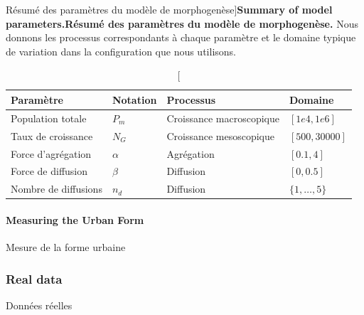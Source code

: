 \begin{table}[!ht]
\caption[Summary of model parameters][Résumé des paramètres du modèle de morphogenèse]{\textbf{Summary of model parameters.}\label{tab:density:parameters}}{\textbf{Résumé des paramètres du modèle de morphogenèse.} Nous donnons les processus correspondants à chaque paramètre et le domaine typique de variation dans la configuration que nous utilisons.\label{tab:density:parameters}}
\begin{tabular}{|l|l|l|l|}
\hline
Paramètre & Notation & Processus & Domaine\\ \hline
Population totale & $P_m$ & Croissance macroscopique & $[1e4,1e6]$\\ \hline
Taux de croissance & $N_G$ & Croissance mesoscopique  & $[500,30000]$\\ \hline
Force d'agrégation & $\alpha$ & Agrégation & $[0.1,4]$\\ \hline
Force de diffusion & $\beta$ & Diffusion & $[0,0.5]$\\ \hline
Nombre de diffusions & $n_d$ & Diffusion & $\{1,\ldots , 5\}$\\ \hline
\end{tabular}
\end{table}


\paragraph{Measuring the Urban Form}{Mesure de la forme urbaine}



\subsubsection{Real data}{Données réelles}


